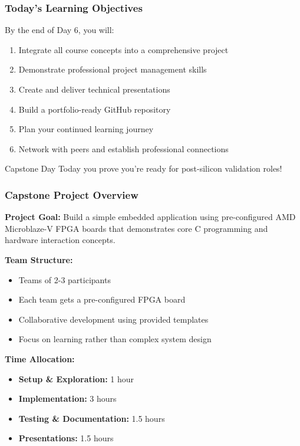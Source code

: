 \documentclass{beamer}
\begin{document}
\begin{frame}
\frametitle{Today's Learning Objectives}
By the end of Day 6, you will:

\begin{enumerate}
    \item Integrate all course concepts into a comprehensive project
    \item Demonstrate professional project management skills
    \item Create and deliver technical presentations
    \item Build a portfolio-ready GitHub repository
    \item Plan your continued learning journey
    \item Network with peers and establish professional connections
\end{enumerate}

\vspace{0.5cm}
\begin{alertblock}{Capstone Day}
Today you prove you're ready for post-silicon validation roles!
\end{alertblock}
\end{frame}

\begin{frame}
\frametitle{Capstone Project Overview}
\footnotesize \textbf{Project Goal:} Build a simple embedded application using pre-configured AMD Microblaze-V FPGA boards that demonstrates core C programming and hardware interaction concepts.

\vspace{0.3cm}
\textbf{Team Structure:}
\begin{itemize}
    \item \footnotesize Teams of 2-3 participants
    \item \footnotesize Each team gets a pre-configured FPGA board
    \item \footnotesize Collaborative development using provided templates
    \item \footnotesize Focus on learning rather than complex system design
\end{itemize}

\vspace{0.3cm}
\textbf{Time Allocation:}
\begin{itemize}
    \item \footnotesize \textbf{Setup \& Exploration:} 1 hour
    \item \footnotesize \textbf{Implementation:} 3 hours
    \item \footnotesize \textbf{Testing \& Documentation:} 1.5 hours
    \item \footnotesize \textbf{Presentations:} 1.5 hours
\end{itemize}
\end{frame}
\end{document}
